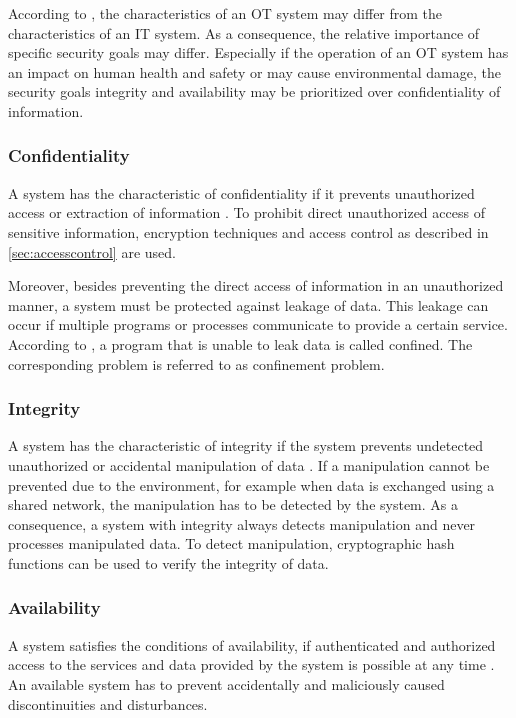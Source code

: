 According to \citeauthor{Stouffer2023} \cite{Stouffer2023}, the characteristics of an OT system may differ from the characteristics of an IT system.
As a consequence, the relative importance of specific security goals may differ.
Especially if the operation of an OT system has an impact on human health and safety or may cause environmental damage, the security goals integrity and availability may be prioritized over confidentiality of information.

\subsubsection{Confidentiality}
A system has the characteristic of confidentiality if it prevents unauthorized access or extraction of information \cite{Eckert2023}.
To prohibit direct unauthorized access of sensitive information, encryption techniques and access control as described in \autoref{sec:accesscontrol} are used.

Moreover, besides preventing the direct access of information in an unauthorized manner, a system must be protected against leakage of data.
This leakage can occur if multiple programs or processes communicate to provide a certain service.
According to \citeauthor{Lampson1973} \cite{Lampson1973}, a program that is unable to leak data is called confined.
The corresponding problem is referred to as confinement problem.

\subsubsection{Integrity}
A system has the characteristic of integrity if the system prevents undetected unauthorized or accidental manipulation of data \cite{Eckert2023}.
If a manipulation cannot be prevented due to the environment, for example when data is exchanged using a shared network, the manipulation has to be detected by the system.
As a consequence, a system with integrity always detects manipulation and never processes manipulated data.
To detect manipulation, cryptographic hash functions can be used to verify the integrity of data.

\subsubsection{Availability}
A system satisfies the conditions of availability, if authenticated and authorized access to the services and data provided by the system is possible at any time \cite{Eckert2023}.
An available system has to prevent accidentally and maliciously caused discontinuities and disturbances.

